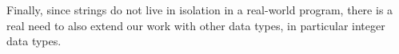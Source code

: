 
Finally, since strings do not live in isolation in
a real-world program, there is a real need to also extend our work with other
data types, in particular integer data types.

